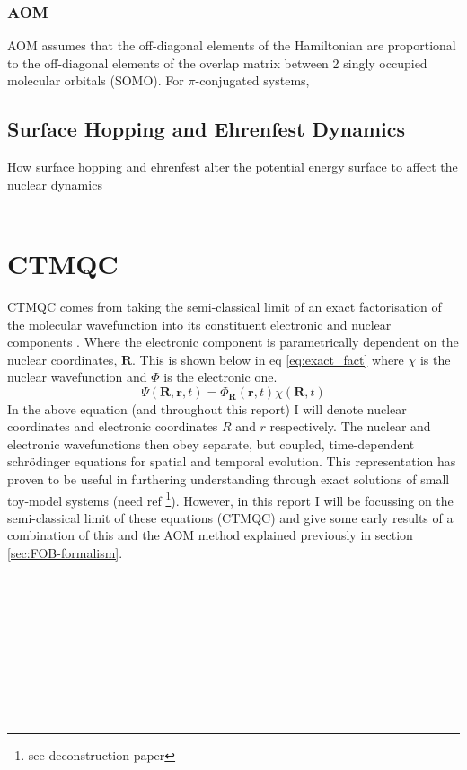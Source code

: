 \subsubsection{AOM}
AOM assumes that the off-diagonal elements of the Hamiltonian are proportional to the off-diagonal elements of the overlap matrix between 2 singly occupied molecular orbitals (SOMO). For $\pi$-conjugated systems,
\subsection{Surface Hopping and Ehrenfest Dynamics}
{\LARGE How surface hopping and ehrenfest alter the potential energy surface to affect the nuclear dynamics}
\\\\
\section{CTMQC \label{intro:CTMQC}}
CTMQC comes from taking the semi-classical limit of an exact factorisation of the molecular wavefunction into its constituent electronic and nuclear components \cite{abedi_exact_2010}. Where the electronic component is parametrically dependent on the nuclear coordinates, $\textbf{R}$. This is shown below in eq \eqref{eq:exact_fact} where $\chi$ is the nuclear wavefunction and $\Phi$ is the electronic one.
\begin{equation}
 \Psi(\textbf{R}, \textbf{r}, t) = \Phi_{\textbf{R}}(\textbf{r}, t) \chi(\textbf{R}, t)
 \label{eq:exact_fact}
 \end{equation}
In the above equation (and throughout this report) I will denote nuclear coordinates and electronic coordinates $R$ and $r$ respectively. The nuclear and electronic wavefunctions then obey separate, but coupled, time-dependent schr\"odinger equations for spatial and temporal evolution. This representation has proven to be useful in furthering understanding through exact solutions of small toy-model systems (need ref \footnote{see deconstruction paper}). However, in this report I will be focussing on the semi-classical limit of these equations (CTMQC) and give some early results of a combination of this and the AOM method explained previously in section \ref{sec:FOB-formalism}.
\\\\\\\\\\\\\\\\\\\
